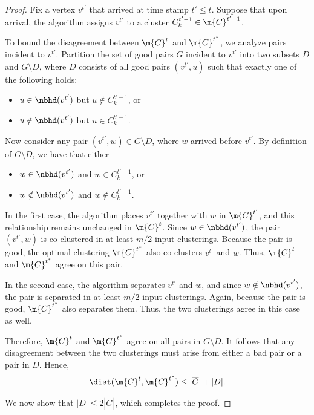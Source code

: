 \begin{proof}
Fix a vertex $v^{t'}$ that arrived at time stamp $t' \le t$.
Suppose that upon arrival, the algorithm assigns $v^{t'}$ to a cluster
$C_k^{t'-1} \in \m{C}^{t'-1}$.

To bound the disagreement between $\m{C}^t$ and $\m{C}^{t^*}$,
we analyze pairs incident to $v^{t'}$.
Partition the set of good pairs $G$ incident to $v^{t'}$
into two subsets $D$ and $G \setminus D$, where $D$ consists of all
good pairs $(v^{t'},u)$ such that exactly one of the following holds:

\begin{itemize}
    \item $u \in \nbhd(v^{t'})$ but $u \notin C_k^{t'-1}$, or
    \item $u \notin \nbhd(v^{t'})$ but $u \in C_k^{t'-1}$.
\end{itemize}

Now consider any pair $(v^{t'}, w) \in G \setminus D$,
where $w$ arrived before $v^{t'}$.
By definition of $G \setminus D$, we have that either

\begin{itemize}
    \item $w \in \nbhd(v^{t'})$ and $w \in C_k^{t'-1}$, or
    \item $w \notin \nbhd(v^{t'})$ and $w \notin C_k^{t'-1}$.
\end{itemize}

In the first case, the algorithm places $v^{t'}$ together with $w$
in $\m{C}^{t'}$, and this relationship remains unchanged in $\m{C}^t$.
Since $w \in \nbhd(v^{t'})$, the pair $(v^{t'},w)$ is co-clustered
in at least $m/2$ input clusterings.
Because the pair is good, the optimal clustering $\m{C}^{t^*}$
also co-clusters $v^{t'}$ and $w$.
Thus, $\m{C}^t$ and $\m{C}^{t^*}$ agree on this pair.

In the second case, the algorithm separates $v^{t'}$ and $w$,
and since $w \notin \nbhd(v^{t'})$, the pair is separated
in at least $m/2$ input clusterings.
Again, because the pair is good, $\m{C}^{t^*}$ also separates them.
Thus, the two clusterings agree in this case as well.

Therefore, $\m{C}^t$ and $\m{C}^{t^*}$ agree on all pairs in
$G \setminus D$.
It follows that any disagreement between the two clusterings
must arise from either a bad pair or a pair in $D$.
Hence,
\[
    \dist(\m{C}^t, \m{C}^{t^*})
    \le
    |\overline{G}| + |D|.
\]

We now show that $|D| \le 2 |\overline{G}|$,
which completes the proof.
\end{proof}
\fi
